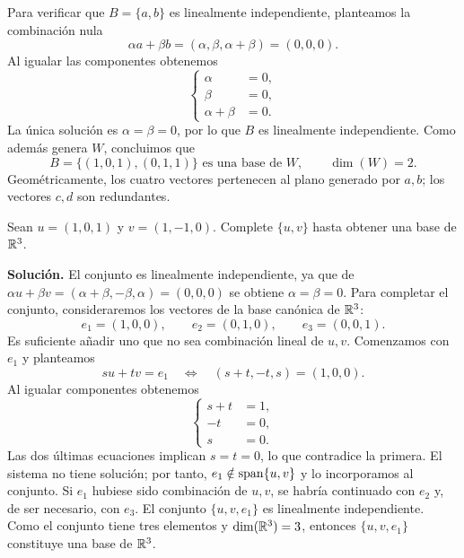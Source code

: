 \documentclass[compacto,10pt]{pubciencias-notas}
\begin{document}
\begin{ejem}
    Para verificar que $B=\{a,b\}$ es linealmente independiente,
    planteamos la combinación nula
    \[
        \alpha a+\beta b
        =(\alpha,\beta,\alpha+\beta)=(0,0,0).
    \]
    Al igualar las componentes obtenemos
    \[
        \left\{\begin{aligned}
            \alpha&=0,\\
            \beta&=0,\\
            \alpha+\beta&=0.
        \end{aligned}\right.
    \]
    La única solución es $\alpha=\beta=0$, por lo que $B$ es
    linealmente independiente. Como además genera $W$, concluimos que
    \[
        B=\{(1,0,1),(0,1,1)\}\text{ es una base de }W,
        \qquad\dim(W)=2.
    \]
    Geométricamente, los cuatro vectores pertenecen al plano generado
    por $a,b$; los vectores $c,d$ son redundantes.
\end{ejem}

\begin{ejem}\label{sem10cl02:completar}
    Sean $u=(1,0,1)$ y $v=(1,-1,0)$. Complete $\{u,v\}$ hasta obtener
    una base de $\mathbb{R}^3$.

    \textbf{Solución.} El conjunto es linealmente independiente, ya que de
    $\alpha u+\beta v=(\alpha+\beta,-\beta,\alpha)=(0,0,0)$ se obtiene
    $\alpha=\beta=0$.
    Para completar el conjunto, consideraremos los vectores de la base
    canónica de $\mathbb{R}^3$:
    \[
        e_1=(1,0,0),\qquad e_2=(0,1,0),\qquad e_3=(0,0,1).
    \]
    Es suficiente añadir uno que no sea combinación lineal de $u,v$.
    Comenzamos con $e_1$ y planteamos
    \[
        su+tv=e_1
        \quad\Longleftrightarrow\quad
        (s+t,-t,s)=(1,0,0).
    \]
    Al igualar componentes obtenemos
    \[
        \left\{\begin{aligned}
            s+t&=1,\\
            -t&=0,\\
            s&=0.
        \end{aligned}\right.
    \]
    Las dos últimas ecuaciones implican $s=t=0$, lo que contradice
    la primera. El sistema no tiene solución; por tanto,
    $e_1\notin\operatorname{span}\{u,v\}$ y lo incorporamos al conjunto.
    Si $e_1$ hubiese sido combinación de $u,v$, se habría continuado
    con $e_2$ y, de ser necesario, con $e_3$.
    El conjunto $\{u,v,e_1\}$ es linealmente independiente.
    Como el conjunto tiene tres elementos y
    $\dim(\mathbb{R}^3)=3$, entonces  $\{u,v,e_1\}$ constituye una base de $\mathbb{R}^3$.
\end{ejem}
\end{document}
